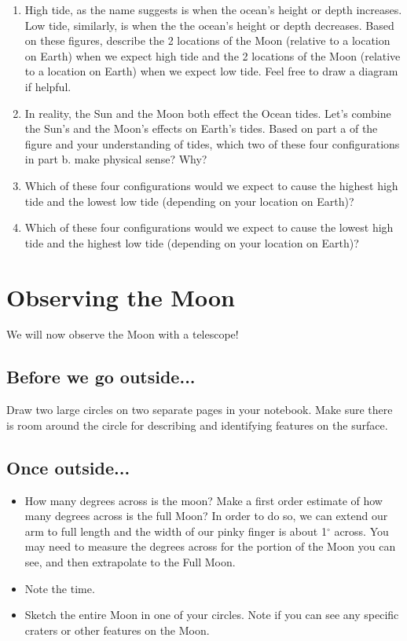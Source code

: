 \documentclass[12pt]{article}%
\begin{document}
\begin{enumerate}
    \item High tide, as the name suggests is when the ocean's height or depth increases. Low tide, similarly, is when the the ocean's height or depth decreases. Based on these figures, describe the 2 locations of the Moon (relative to a location on Earth) when we expect high tide and the 2 locations of the Moon (relative to a location on Earth) when we expect low tide. Feel free to draw a diagram if helpful.

    \item In reality, the Sun and the Moon both effect the Ocean tides. Let's combine the Sun's and the Moon's effects on Earth's tides. Based on part a of the figure and your understanding of tides, which two of these four configurations in part b. make physical sense? Why?
    
    \item Which of these four configurations would we expect to cause the highest high tide and the lowest low tide (depending on your location on Earth)? 
    
    \item Which of these four configurations would we expect to cause the lowest high tide and the highest low tide (depending on your location on Earth)? 
\end{enumerate}


\section{Observing the Moon}
We will now observe the Moon with a telescope!

\subsection*{Before we go outside...}
\noindent Draw two large circles on two separate pages in your notebook.
Make sure there is room around the circle for describing and identifying features on the surface.

\subsection*{Once outside...}
\begin{itemize}
    \item How many degrees across is the moon? 
    Make a first order estimate of how many degrees across is the full Moon? In order to do so, we can extend our arm to full length and the width of our pinky finger is about 1$^{\circ}$ across. You may need to measure the degrees across for the portion of the Moon you can see, and then extrapolate to the Full Moon.
    \item Note the time.
    \item Sketch the entire Moon in one of your circles. Note if you can see any specific craters or other features on the Moon.
\end{itemize}
\end{document}
